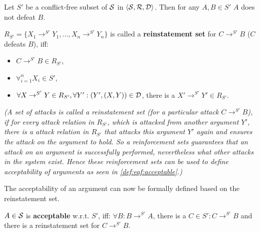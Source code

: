 \begin{lemma}
Let $S'$ be a conflict-free subset of $\S$ in $\langle \S, \R, \D \rangle$. Then for any $A, B \in S'$ $A$ does not defeat $B$.
\end{lemma}

\begin{definition}

$R_{S'} = \{X_1 \rightarrow^{S'} Y_1, ..., 	X_n \rightarrow^{S'} Y_n\}$ is called a \textbf{reinstatement set} for $C \rightarrow^{S'} B$ ($C$ defeats $B$), iff:
\begin{itemize}
	\item $C \rightarrow^{S'} B \in R_{S'}$,
	\item $\forall_{i=1}^n X_i \in S'$,
	\item $\forall X \rightarrow^{S'} Y \in R_{S'}, \forall Y': (Y', (X, Y)) \in \D$, there is a $X' \rightarrow^{S'} Y' \in R_{S'}$.
\end{itemize}
\textit{(A set of attacks is called a reinstatement set (for a particular attack $C \rightarrow^{S'} B$), if for every attack relation in $R_{S'}$, which is attacked from another argument $Y'$, there is a attack relation in $R_{S'}$ that attacks this argument $Y'$ again and ensures the attack on the argument to hold. So a reinforcement sets guarantees that an attack on an argument is successfully performed, nevertheless what other attacks in the system exist. Hence these reinforcement sets can be used to define acceptability of arguments as seen in \autoref{def:eaf:acceptable}.)}
\end{definition}

The acceptability of an argument can now be formally defined based on the reinstatement set.

\begin{definition}
\label{def:eaf:acceptable}
$A \in \S$ is \textbf{acceptable} w.r.t.	 $S'$, iff: $\forall B: B \rightarrow^{S'} A$, there is a $C \in S': C \rightarrow^{S'} B$ and there is a reinstatement set for $C \rightarrow^{S'} B$.
\end{definition}


